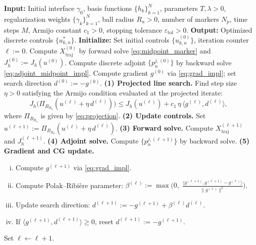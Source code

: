 \documentclass[12pt, reqno]{amsart}
\theoremstyle{plain}
\theoremstyle{definition}
\numberwithin{equation}{section}
\numberwithin{figure}{section}
\numberwithin{algorithm}{section}
\begin{document}
\begin{algorithm}[t]
\caption{Adjoint-based optimization of interface length}\label{alg:optimize}
\begin{algorithmic}[1]
    \State \textbf{Input:} Initial interface $\gamma_0$, basis functions $\{h_k\}_{k=1}^N$, parameters $T,\lambda>0$, regularization weights $\{\gamma_k\}_{k=1}^N$, ball radius $R_u>0$, number of markers $N_p$, time steps $M$, Armijo constant $c_1>0$, stopping tolerance $\varepsilon_{\mathrm{tol}}>0$.
    \State \textbf{Output:} Optimized discrete controls $\{u_{k,n}^*\}$.
    \State \textbf{Initialize:} Set initial controls $\{u_{k,n}^{(0)}\}$, iteration counter $\ell:=0$.
    \State Compute $X_{\mathrm{traj}}^{(0)}$ by forward solve \eqref{eq:midpoint_marker} and $J_h^{(0)}:=J_h(u^{(0)})$.
    \State Compute discrete adjoint $\{p_n^{j,(0)}\}$ by backward solve \eqref{eq:adjoint_midpoint_impl}.
    \State Compute gradient $g^{(0)}$ via \eqref{eq:grad_impl}; set search direction $d^{(0)}:=-g^{(0)}$.
    \Repeat
        \State \textbf{(1) Projected line search.} Find step size $\eta>0$ satisfying the Armijo condition evaluated at the projected iterate:
        \[
            J_h\!\bigl(\Pi_{B_{R_u}}(u^{(\ell)}+\eta\,d^{(\ell)})\bigr)\le J_h(u^{(\ell)})+c_1\,\eta\,\langle g^{(\ell)},d^{(\ell)}\rangle,
        \]
        where $\Pi_{B_{R_u}}$ is given by \eqref{eq:projection}.
        \State \textbf{(2) Update controls.} Set $u^{(\ell+1)}:=\Pi_{B_{R_u}}(u^{(\ell)}+\eta\,d^{(\ell)})$.
        \State \textbf{(3) Forward solve.} Compute $X_{\mathrm{traj}}^{(\ell+1)}$ and $J_h^{(\ell+1)}$.
        \State \textbf{(4) Adjoint solve.} Compute $\{p_n^{j,(\ell+1)}\}$ by backward solve.
        \State \textbf{(5) Gradient and CG update.}
        \begin{enumerate}[(i)]
            \item Compute $g^{(\ell+1)}$ via \eqref{eq:grad_impl}.
            \item Compute Polak--Ribi\`ere parameter:
            $\beta^{(\ell)}:=\max\!\Big(0,\;\frac{\langle g^{(\ell+1)},g^{(\ell+1)}-g^{(\ell)}\rangle}{\|g^{(\ell)}\|^2}\Big)$.
            \item Update search direction: $d^{(\ell+1)}:=-g^{(\ell+1)}+\beta^{(\ell)}d^{(\ell)}$.
            \item If $\langle g^{(\ell+1)},d^{(\ell+1)}\rangle\ge 0$, reset $d^{(\ell+1)}:=-g^{(\ell+1)}$.
        \end{enumerate}
        \State Set $\ell\leftarrow\ell+1$.
\end{algorithmic}
\end{algorithm}
\end{document}
